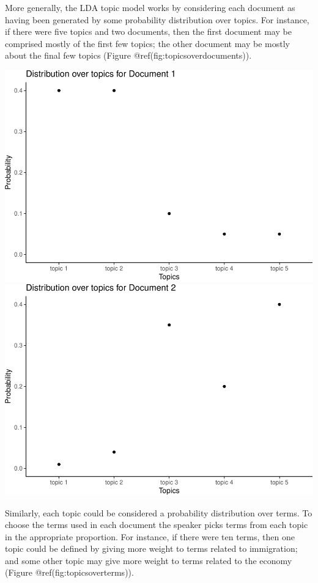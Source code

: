\documentclass[12pt,]{article}
\begin{document}
More generally, the LDA topic model works by considering each document
as having been generated by some probability distribution over topics.
For instance, if there were five topics and two documents, then the
first document may be comprised mostly of the first few topics; the
other document may be mostly about the final few topics (Figure
@ref(fig:topicsoverdocuments)).

\includegraphics{svm-rmarkdown-article-example_files/figure-latex/topicsoverdocuments-1.pdf}
\includegraphics{svm-rmarkdown-article-example_files/figure-latex/topicsoverdocuments-2.pdf}

Similarly, each topic could be considered a probability distribution
over terms. To choose the terms used in each document the speaker picks
terms from each topic in the appropriate proportion. For instance, if
there were ten terms, then one topic could be defined by giving more
weight to terms related to immigration; and some other topic may give
more weight to terms related to the economy (Figure
@ref(fig:topicsoverterms)).
\end{document}

